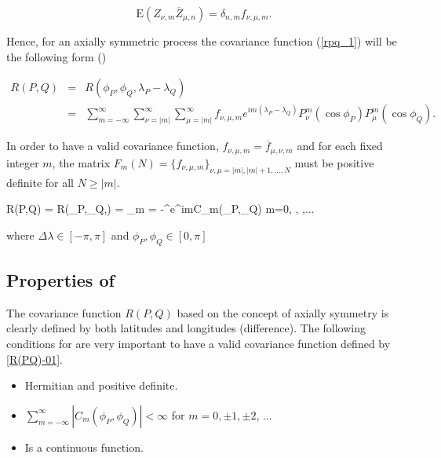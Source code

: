 		\[
			\mbox{E} (Z_{\nu,m} \overline{Z}_{\mu,n}) = \delta_{n,m} f_{\nu,\mu,m}.
		\]
			
		Hence, for an axially symmetric process the covariance function (\ref{rpq_1}) will be the following form (\cite{Huang2012}) 
			
		\begin{eqnarray} \label{axially-symmetry-cov}
			R(P,Q)  & = & R(\phi_P, \phi_Q, \lambda_P-\lambda_Q) \nonumber \\
			& = & \sum_{m=-\infty}^{\infty} \sum_{\nu=|m|}^\infty \sum_{\mu=|m|}^\infty f_{\nu,\mu,m} e^{im (\lambda_P-\lambda_Q)} P_{\nu}^m(\cos \phi_P) P_{\mu}^m (\cos \phi_Q) .
		\end{eqnarray}
			
		In order to have a valid covariance function, $f_{\nu,\mu, m} = \overline{f}_{\mu, \nu, m}$ and for each fixed integer $m$, the matrix $F_m(N) = \{ f_{\nu,\mu,m} \}_{\nu,\mu=|m|,|m|+1, \ldots, N }$ must be positive definite for all $N \ge |m|$. 
		
		\beq \label{R(PQ)-01}
		R(P,Q) = R(\phi_P,\phi_Q,\Delta\lambda) = \sum_{m = -\infty}^{\infty}e^{im\Delta\lambda}C_m(\phi_P,\phi_Q) \quad m=0, , ,...
		\eeq
		
		where $\Delta\lambda \in [-\pi, \pi]$ and $\phi_P, \phi_Q \in [0,\pi]$
		\subsection{Properties of \Cm}
			
		The covariance function $R(P,Q)$ based on the concept of axially symmetry is clearly defined by both latitudes and longitudes (difference). The following conditions for \Cm are very important to have a valid covariance function defined by \ref{R(PQ)-01}.  
			
		\begin{itemize}
			\item Hermitian and positive definite.
			\item $\sum_{m = -\infty}^{\infty}|C_m(\phi_P,\phi_Q)|<\infty$ for $m=0,\pm 1, \pm  2$, ...
			\item Is a continuous function. 
		\end{itemize}
		
